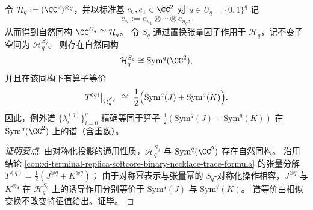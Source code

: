 \begin{conclusion}\label{con:xi-terminal-replica-softcore-exceptional-spectrum-sympower-model}
令 \(\mathcal H_q:=(\CC^2)^{\otimes q}\)，并以标准基 \(e_0,e_1\in\CC^2\) 对 \(u\in U_q=\{0,1\}^q\) 记
\[
e_u:=e_{u_1}\otimes\cdots\otimes e_{u_q},
\]
从而得到自然同构 \(\CC^{U_q}\cong \mathcal H_q\)。
令 \(S_q\) 通过置换张量因子作用于 \(\mathcal H_q\)，记不变子空间为 \(\mathcal H_q^{S_q}\)。
则存在自然同构
\[
\mathcal H_q^{S_q}\cong \mathrm{Sym}^q(\CC^2),
\]
并且在该同构下有算子等价
\[
T^{(q)}\big|_{\mathcal H_q^{S_q}}
\ \cong\
\frac12\Bigl(\mathrm{Sym}^q(J)+\mathrm{Sym}^q(K)\Bigr).
\]
因此，例外谱 \(\{\lambda_i^{(q)}\}_{i=0}^{q}\) 精确等同于算子
\(\tfrac12(\mathrm{Sym}^q(J)+\mathrm{Sym}^q(K))\) 在 \(\mathrm{Sym}^q(\CC^2)\) 上的谱（含重数）。
\end{conclusion}
\begin{proof}[证明要点]
由对称化投影的通用性质，\(\mathcal H_q^{S_q}\) 与 \(\mathrm{Sym}^q(\CC^2)\) 存在自然同构。
沿用结论 \ref{con:xi-terminal-replica-softcore-binary-necklace-trace-formula} 的张量分解
\(
T^{(q)}=\tfrac12(J^{\otimes q}+K^{\otimes q})
\)；
由于对称幂表示与张量幂的 \(S_q\)-对称化操作相容，\(J^{\otimes q}\) 与 \(K^{\otimes q}\) 在
\(\mathcal H_q^{S_q}\) 上的诱导作用分别等价于 \(\mathrm{Sym}^q(J)\) 与 \(\mathrm{Sym}^q(K)\)。
谱等价由相似变换不改变特征值给出。证毕。
\end{proof}
